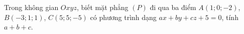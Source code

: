 \begin{ex}
Trong không gian $Oxyz$, biết mặt phẳng $(P)$ đi qua ba điểm $A(1;0;-2)$, $B(-3;1;1)$, $C(5;5;-5)$ có phương trình dạng $ax+by+cz+5=0$, tính $a+b+c$.
\end{ex}

